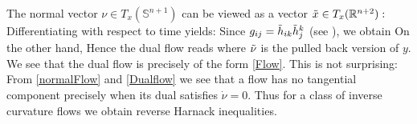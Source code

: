 The normal vector $\nu\in T_x(\mathbb{S}^{n+1})$ can be viewed as a vector $\tilde{x}\in T_x(\R^{n+2}):$
Differentiating with respect to time yields:
Since $g_{ij}=\~h_{ik}\~h^k_j$ (see \cite[Thm.~9.2.5]{Gerhardt:/2006}), we obtain
On the other hand,
 Hence the dual flow reads
 where $\~\nu$ is the pulled back version of $y$. We see that the dual flow is precisely of the form \eqref{Flow}. This is not surprising: From \eqref{normalFlow} and \eqref{Dualflow} we see that a flow has no tangential component precisely when its dual satisfies $\dot{\nu}=0.$
Thus for a class of inverse curvature flows we obtain reverse Harnack inequalities. 

